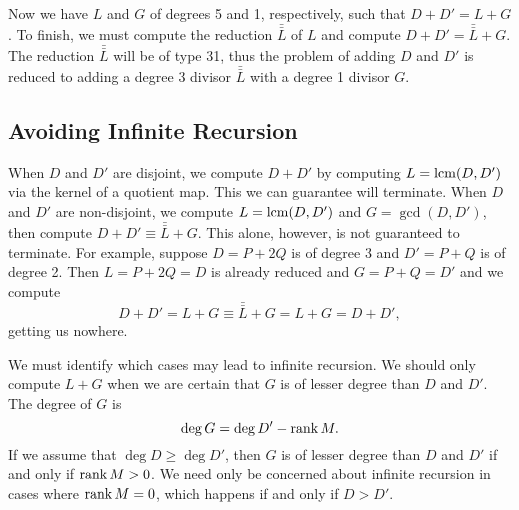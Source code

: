 Now we have $L$ and $G$ of degrees 5 and 1, respectively, such that $D + D' = L + G$.
To finish, we must compute the reduction $\bar{\bar L}$ of $L$ and compute $D + D' = \bar{\bar L} + G$.
The reduction $\bar{\bar L}$ will be of type 31, thus the problem of adding $D$ and $D'$
is reduced to adding a degree 3 divisor $\bar{\bar L}$ with a degree 1 divisor $G$.




\subsection{Avoiding Infinite Recursion}

When $D$ and $D'$ are disjoint, we compute $D + D'$ by computing $L = \operatorname{lcm}(D, D')$ via the kernel of a quotient map.
This we can guarantee will terminate.
When $D$ and $D'$ are non-disjoint, we compute $L = \operatorname{lcm}(D, D')$ and $G = \gcd(D, D')$, then compute
$D + D' \equiv \bar{\bar L} + G$.
This alone, however, is not guaranteed to terminate.
For example, suppose $D = P + 2Q$ is of degree 3 and $D' = P + Q$ is of degree 2.
Then $L = P + 2Q = D$ is already reduced and $G = P + Q = D'$ and we compute
  \[ D + D' = L + G \equiv \bar{\bar L} + G = L + G = D + D', \]
getting us nowhere.

We must identify which cases may lead to infinite recursion.
We should only compute $L + G$ when we are certain that $G$ is of lesser degree than $D$ and $D'$.
The degree of $G$ is
  \[ \deg G = \deg D' - \operatorname{rank} M. \]
If we assume that $\deg D \geq \deg D'$, then $G$ is of lesser degree than $D$ and $D'$ if and only if $\operatorname{rank} M > 0$.
We need only be concerned about infinite recursion in cases where $\operatorname{rank} M = 0$,
which happens if and only if $D > D'$.

